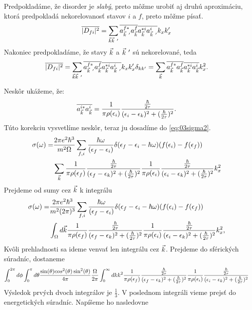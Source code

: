 Predpokladáme, že disorder je {\it slabý}, preto môžme urobiť aj druhú aproximáciu, ktorá predpokladá nekorelovanosť stavov $i$ a $f$, preto môžme písať.
\begin{align}
\overline{|D_{fi}|^2}=\sum_{\vk\vk\ '}\overline{a^{f*}_{\vk\ '}a^f_{\vk}}\overline{a^{*i}_{\vk}a^i_{\vk\ '}}k_xk_x' 
\end{align}
Nakoniec predpokladáme, že stavy $\vec{k}$ a $\vk\ '$ sú nekorelované, teda
\begin{align}
\label{eq:03dfisq3}
\overline{|D_{fi}|^2}=\sum_{\vk\vk\ '}\overline{a^{f*}_{\vk\ '}a^f_{\vk}}\overline{a^{*i}_{\vk}a^i_{\vk\ '}}k_xk_x'\delta_{kk'}=\sum_{\vk}\overline{a^{f*}_{\vk}a^f_{\vk}}\overline{a^{*i}_{\vk}a^i_{\vk}}k_x^2\text{.}
\end{align}


Neskôr ukážeme, že:
\begin{align}
\label{eq:03lorenz}
\overline{a_{\vec{k}}^{i*}a_{\vec{k}}^i}=\frac{1}{\pi\rho(\epsilon_i)}\frac{\frac{\hbar}{2\tau}}{(\epsilon_i-\epsilon_{k})^2+(\frac{\hbar}{2\tau})^2}\text{.}
\end{align}
Túto korekciu vysvetlíme neskôr, teraz ju dosadíme do \eqref{eq:03sigma2}.
\begin{align}
\sigma(\omega)=&\frac{2\pi e^2\hbar^3}{m^2\Omega}\sum_{f,i}\frac{\hbar\omega}{(\epsilon_f-\epsilon_i)}\delta(\epsilon_f-\epsilon_i-\hbar\omega)(f(\epsilon_i)-f(\epsilon_f))\\ \notag
&\sum_{\vec{k}}\frac{1}{\pi\rho(\epsilon_f)}\frac{\frac{\hbar}{2\tau}}{(\epsilon_f-\epsilon_{k})^2+(\frac{\hbar}{2\tau})^2}\frac{1}{\pi\rho(\epsilon_i)}\frac{\frac{\hbar}{2\tau}}{(\epsilon_i-\epsilon_{k})^2+(\frac{\hbar}{2\tau})^2}k_x^2
\end{align}
Prejdeme od sumy cez $\vec{k}$ k integrálu
\begin{align}
\label{eq:03sigma3}
\sigma(\omega)=&\frac{2\pi e^2\hbar^3}{m^2(2\pi)^3}\sum_{f,i}\frac{\hbar\omega}{(\epsilon_f-\epsilon_i)}\delta(\epsilon_f-\epsilon_i-\hbar\omega)(f(\epsilon_i)-f(\epsilon_f))\\ \notag
&\int_{\Omega}d\vec{k}\frac{1}{\pi\rho(\epsilon_f)}\frac{\frac{\hbar}{2\tau}}{(\epsilon_f-\epsilon_{k})^2+(\frac{\hbar}{2\tau})^2}\frac{1}{\pi\rho(\epsilon_i)}\frac{\frac{\hbar}{2\tau}}{(\epsilon_i-\epsilon_{k})^2+(\frac{\hbar}{2\tau})^2}k_x^2\text{,}
\end{align}
 Kvôli prehladnosti sa ideme venvať len integrálu cez $\vec{k}$. Prejdeme do sférických súradníc, dostaneme
\begin{align}
\int_0^{2\pi}d\phi\int_0^\pi d\theta \frac{\sin(\theta)cos^2(\theta)\sin^2(\theta)}{4\pi} \frac{\Omega}{2\pi} \int_0^\infty dk k^2 \frac{1}{\pi\rho(\epsilon_f)}\frac{\frac{\hbar}{2\tau}}{(\epsilon_f-\epsilon_{k})^2+(\frac{\hbar}{2\tau})^2} \frac{1}{\pi\rho(\epsilon_i)}\frac{\frac{\hbar}{2\tau}}{(\epsilon_i-\epsilon_{k})^2+(\frac{\hbar}{2\tau})^2} 
\end{align}
Výsledok prvých dvoch integrálov je $\frac{1}{3}$. V poslednom integráli vieme prejsť do energetických súradníc. Napíšeme ho nasledovne
